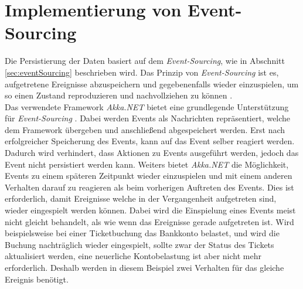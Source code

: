 \section{Implementierung von Event-Sourcing}
\label{sec:implementation:eventSouring}
Die Persistierung der Daten basiert auf dem \textit{Event-Sourcing}, wie in Abschnitt \ref{sec:eventSourcing} beschrieben wird. Das Prinzip von \textit{Event-Sourcing} ist es, aufgetretene Ereignisse abzuspeichern und gegebenenfalls wieder einzuspielen, um so einen Zustand reproduzieren und nachvollziehen zu können \citep{betts2013CQRSEventSourcing}. \\
Das verwendete Framework \textit{Akka.NET} bietet eine grundlegende Unterstützung für \textit{Event-Sourcing} \citep{Akka.NETCommunityAkka.NETDocumentation}. Dabei werden Events als Nachrichten repräsentiert, welche dem Framework übergeben und anschließend abgespeichert werden. 
Erst nach erfolgreicher Speicherung des Events, kann auf das Event selber reagiert werden. Dadurch wird verhindert, dass Aktionen zu Events ausgeführt werden, jedoch das Event nicht persistiert werden kann. Weiters bietet \textit{Akka.NET} die Möglichkeit, Events zu einem späteren Zeitpunkt wieder einzuspielen und mit einem anderen Verhalten darauf zu reagieren als beim vorherigen Auftreten des Events. Dies ist erforderlich, damit Ereignisse welche in der Vergangenheit aufgetreten sind, wieder eingespielt werden können. Dabei wird die Einspielung eines Events meist nicht gleicht behandelt, als wie wenn das Ereignisse gerade aufgetreten ist. Wird beispielsweise bei einer Ticketbuchung das Bankkonto belastet, und wird die Buchung nachträglich wieder eingespielt, sollte zwar der Status des Tickets aktualisiert werden, eine neuerliche Kontobelastung ist aber nicht mehr erforderlich. Deshalb werden in diesem Beispiel zwei Verhalten für das gleiche Ereignis benötigt.
